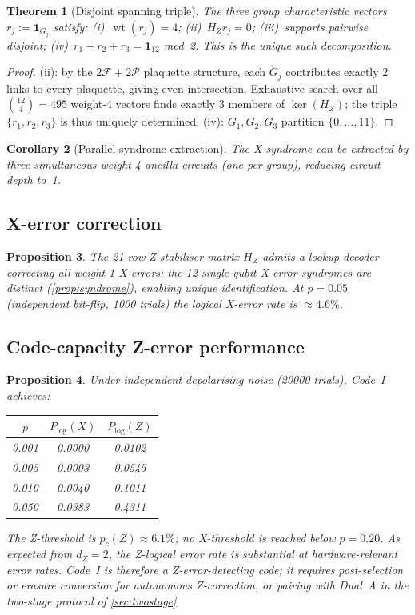\documentclass[12pt,a4paper]{article}
\theoremstyle{plain}
\newtheorem{theorem}{Theorem}[section]
\newtheorem{proposition}[theorem]{Proposition}
\newtheorem{corollary}[theorem]{Corollary}
\theoremstyle{definition}
\theoremstyle{remark}
\newcommand{\HZ}{H_Z}
\newcommand{\wt}{\operatorname{wt}}
\newcommand{\FS}{\mathcal{F}}
\newcommand{\PS}{\mathcal{P}}
\begin{document}
\begin{theorem}[Disjoint spanning triple]\label{thm:triple}
The three group characteristic vectors $r_j := \bm{1}_{G_j}$ satisfy:
(i)~$\wt(r_j)=4$;\;
(ii)~$\HZ r_j = 0$;\;
(iii)~supports pairwise disjoint;\;
(iv)~$r_1+r_2+r_3 = \bm{1}_{12}$ mod~2.
This is the unique such decomposition.
\end{theorem}
\begin{proof}
(ii): by the $2\FS+2\PS$ plaquette structure, each $G_j$ contributes
exactly 2 links to every plaquette, giving even intersection.
Exhaustive search over all $\binom{12}{4}=495$ weight-4 vectors finds
exactly 3 members of $\ker(\HZ)$; the triple $\{r_1,r_2,r_3\}$ is
thus uniquely determined.
(iv): $G_1,G_2,G_3$ partition $\{0,\ldots,11\}$.
\end{proof}

\begin{corollary}[Parallel syndrome extraction]\label{cor:parallel}
The X-syndrome can be extracted by three simultaneous weight-4 ancilla
circuits (one per group), reducing circuit depth to~1.
\end{corollary}

\subsection{X-error correction}

\begin{proposition}\label{prop:bp}
The 21-row Z-stabiliser matrix $\HZ$ admits a lookup decoder correcting
all weight-1 X-errors: the 12 single-qubit X-error syndromes are distinct
(\cref{prop:syndrome}), enabling unique identification.
At $p=0.05$ (independent bit-flip, 1000 trials) the logical X-error
rate is $\approx 4.6\%$.
\end{proposition}

\subsection{Code-capacity Z-error performance}

\begin{proposition}\label{prop:codeI_z}
Under independent depolarising noise (20000 trials), Code~I achieves:
\begin{center}
\small
\begin{tabular}{ccc}
\toprule
$p$ & $P_{\log}(X)$ & $P_{\log}(Z)$ \\
\midrule
0.001 & 0.0000 & 0.0102 \\
0.005 & 0.0003 & 0.0545 \\
0.010 & 0.0040 & 0.1011 \\
0.050 & 0.0383 & 0.4311 \\
\bottomrule
\end{tabular}
\end{center}
The Z-threshold is $p_c(Z) \approx 6.1\%$; no X-threshold is reached
below $p=0.20$.
As expected from $d_Z = 2$, the Z-logical error rate is substantial
at hardware-relevant error rates.
Code~I is therefore a Z-error-\emph{detecting} code; it requires
post-selection or erasure conversion for autonomous Z-correction,
or pairing with Dual~A in the two-stage protocol of \cref{sec:twostage}.
\end{proposition}
\end{document}
